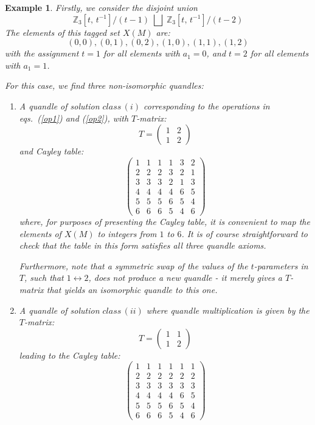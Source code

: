 \documentclass[a4paper,12pt]{article}
\newtheorem{example}{Example}[section]
\begin{document}
\begin{example}
\label{eg5.1.0}
 Firstly, we consider the disjoint union   
\[  \mathbb{Z}_3 [t, \, t^{-1}]  / (t-1) \; \bigsqcup  \; \mathbb{Z}_3 [t, \, t^{-1}]  / (t-2) \] 
The elements of this tagged set $X(M)$ are:  
$$ (0,0),  (0,1),  (0,2),  (1,0),  (1,1),  (1,2)  $$ 
with the assignment $t =1$ for all elements with $a_1 = 0$, and $t =2$ for all elements with $a_1 = 1$. 

For this case, we find three non-isomorphic quandles:  
\begin{enumerate}
    \item   A quandle of solution $class \, (i)$ corresponding to the operations in eqs.~(\ref{op1}) and (\ref{op2}), with $T$-matrix:    
    \[  T =  \begin{pmatrix}
    1 & 2  \\
    1 & 2
\end{pmatrix}     \]  
and Cayley table:   
$$  \left(  \begin{array}{cccccc}   
 1 & 1 & 1 & 1 & 3 & 2 \\
 2 & 2 & 2 & 3 & 2 & 1 \\
 3 & 3 & 3 & 2 & 1 & 3 \\
 4 & 4 & 4 & 4 & 6 & 5 \\
 5 & 5 & 5 & 6 & 5 & 4 \\
 6 & 6 & 6 & 5 & 4 & 6 
\end{array}  \right)    $$
where, for purposes of presenting the Cayley table, it is convenient to map the elements of $X(M)$ to integers from $1$ to $6$. It is of course straightforward to check that the table in this form satisfies all three quandle axioms. 

Furthermore, note that a symmetric swap of the values of the $t$-parameters in $T$, such that $1 \leftrightarrow 2$, does not produce a new quandle - it merely gives a $T$-matrix that yields an isomorphic quandle to this one. 

\item  A quandle of solution $class \, (ii)$ where quandle multiplication is given  by the $T$-matrix:   
    \[  T =  \begin{pmatrix}
    1 & 1  \\
    1 & 2
\end{pmatrix}     \]  
leading to the Cayley table:
$$  \left(  \begin{array}{cccccc}  
 1 & 1 & 1 & 1 & 1 & 1 \\
 2 & 2 & 2 & 2 & 2 & 2 \\
 3 & 3 & 3 & 3 & 3 & 3 \\
 4 & 4 & 4 & 4 & 6 & 5 \\
 5 & 5 & 5 & 6 & 5 & 4 \\
 6 & 6 & 6 & 5 & 4 & 6
\end{array}  \right)   $$


\end{enumerate}
\end{example}
\end{document}
